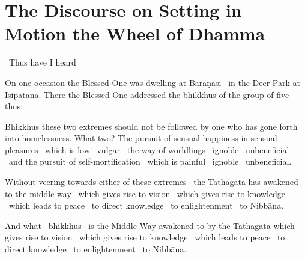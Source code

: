 \section{The Discourse on Setting in Motion the Wheel of Dhamma}
\label{wheel-of-dhamma-full}

\begin{leader-english}
  \anglebracketleft\ \hspace{-0.5mm}Thus have I heard \hspace{-0.5mm}\anglebracketright\
\end{leader-english}

\smallskip

\begin{english-hang}
  On one occasion the Blessed One was dwelling at Bārāṇasī \breathmark\ in the Deer Park at Isipatana. There the Blessed One addressed the bhikkhus of the group of five thus:
\end{english-hang}

\medskip

\begin{english-hang}
  Bhikkhus these two extremes should not be followed by one who has gone forth into homelessness. What two? The pursuit of sensual happiness in sensual pleasures \breathmark\ which is low \breathmark\ vulgar \breathmark\ the way of worldlings \breathmark\ ignoble \breathmark\ unbeneficial \breathmark\ and the pursuit of self-mortification \breathmark\ which is painful \breathmark\ ignoble \breathmark\ unbeneficial.
\end{english-hang}

\medskip

\begin{english-hang}
  Without veering towards either of these extremes \breathmark\ the Tathāgata has awakened to the middle way \breathmark\ which gives rise to vision \breathmark\ which gives rise to knowledge \breathmark\ which leads to peace \breathmark\ to direct knowledge \breathmark\ to enlightenment \breathmark\ to Nibbāna.
\end{english-hang}

\medskip

\begin{english-hang}
  And what \breathmark\ bhikkhus \breathmark\ is the Middle Way awakened to by the Tathāgata which gives rise to vision \breathmark\ which gives rise to knowledge \breathmark\ which leads to peace \breathmark\ to direct knowledge \breathmark\ to enlightenment \breathmark\ to Nibbāna.
\end{english-hang}

